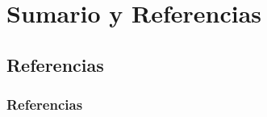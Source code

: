 ﻿\documentclass[animated,a4paper,slidestop,xcolor=pst,blue]{beamer}
\begin{document}
%
%

\section{Sumario y Referencias}
%
%
%
\subsection{Referencias}

\begin{frame}
	\frametitle{Referencias}
	
	
\end{frame}
\end{document}

